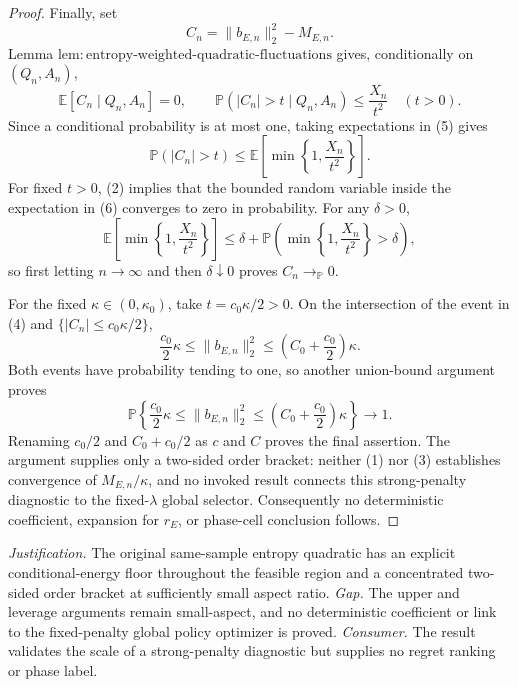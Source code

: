 \documentclass{article}
\begin{document}
\begin{proof}
Finally, set
\[
 C_n=\|b_{E,n}\|_2^2-M_{E,n}.
\]
Lemma \(\mathrm{lem{:}entropy\mbox{-}weighted\mbox{-}quadratic\mbox{-}fluctuations}\) gives, conditionally on \((Q_n,A_n)\),
\[
 \mathbb E[C_n\mid Q_n,A_n]=0,
 \qquad
 \mathbb P(|C_n|>t\mid Q_n,A_n)\le \frac{X_n}{t^2}
 \quad(t>0).
 \tag{5}
\]
Since a conditional probability is at most one, taking expectations in (5) gives
\[
 \mathbb P(|C_n|>t)
 \le \mathbb E\!\left[\min\left\{1,\frac{X_n}{t^2}\right\}\right].
 \tag{6}
\]
For fixed \(t>0\), (2) implies that the bounded random variable inside the expectation in (6) converges to zero in probability.  For any \(\delta>0\),
\[
 \mathbb E\!\left[\min\left\{1,\frac{X_n}{t^2}\right\}\right]
 \le \delta+
 \mathbb P\!\left(\min\left\{1,\frac{X_n}{t^2}\right\}>\delta\right),
\]
so first letting \(n\to\infty\) and then \(\delta\downarrow0\) proves \(C_n\to_{\mathbb P}0\).

For the fixed \(\kappa\in(0,\kappa_0)\), take \(t=c_0\kappa/2>0\).  On the intersection of the event in (4) and \(\{|C_n|\le c_0\kappa/2\}\),
\[
 \frac{c_0}{2}\kappa
 \le \|b_{E,n}\|_2^2
 \le \left(C_0+\frac{c_0}{2}\right)\kappa.
\]
Both events have probability tending to one, so another union-bound argument proves
\[
 \mathbb P\!\left\{
  \frac{c_0}{2}\kappa\le\|b_{E,n}\|_2^2
  \le\left(C_0+\frac{c_0}{2}\right)\kappa
 \right\}\longrightarrow1.
\]
Renaming \(c_0/2\) and \(C_0+c_0/2\) as \(c\) and \(C\) proves the final assertion.  The argument supplies only a two-sided order bracket: neither (1) nor (3) establishes convergence of \(M_{E,n}/\kappa\), and no invoked result connects this strong-penalty diagnostic to the fixed-\(\lambda\) global selector.  Consequently no deterministic coefficient, expansion for \(r_E\), or phase-cell conclusion follows.
\end{proof}
\par\smallskip\noindent \textit{Justification.} The original same-sample entropy quadratic has an explicit conditional-energy floor throughout the feasible region and a concentrated two-sided order bracket at sufficiently small aspect ratio. \textit{Gap.} The upper and leverage arguments remain small-aspect, and no deterministic coefficient or link to the fixed-penalty global policy optimizer is proved. \textit{Consumer.} The result validates the scale of a strong-penalty diagnostic but supplies no regret ranking or phase label.
\end{document}
